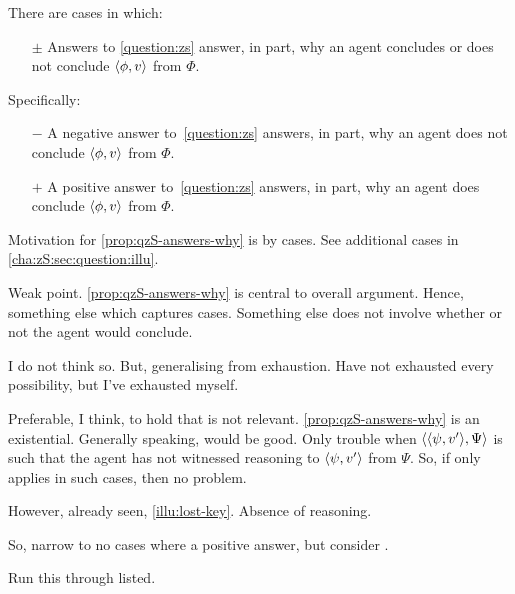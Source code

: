 \begin{note}
  \begin{idea}
    \label{prop:qzS-answers-why}
    There are cases in which:

    \begin{itemize}
    \item[\(\pm\)]
      Answers to \autoref{question:zs} answer, in part, why an agent concludes or does not conclude \(\langle \phi, v \rangle\) from \(\Phi\).
    \end{itemize}

    Specifically:
    \begin{itemize}
    \item[\(-\)]
      A negative answer to~\autoref{question:zs} answers, in part, why an agent does not conclude \(\langle \phi, v \rangle\) from \(\Phi\).
    \item[\(+\)]
      A positive answer to~\autoref{question:zs} answers, in part, why an agent does conclude \(\langle \phi, v \rangle\) from \(\Phi\).
    \end{itemize}
  \end{idea}

  Motivation for \autoref{prop:qzS-answers-why} is by cases.
  See additional cases in \autoref{cha:zS:sec:question:illu}.

  Weak point.
  \autoref{prop:qzS-answers-why} is central to overall argument.
  Hence, something else which captures cases.
  Something else does not involve whether or not the agent would conclude.

  I do not think so.
  But, generalising from exhaustion.
  Have not exhausted every possibility, but I've exhausted myself.

  Preferable, I think, to hold that \qzS{} is not relevant.
  \autoref{prop:qzS-answers-why} is an existential.
  Generally speaking, would be good.
  Only trouble when \(\langle \langle \psi, v' \rangle, \Psi \rangle\) is such that the agent has not witnessed reasoning to \(\langle \psi, v' \rangle\) from \(\Psi\).
  So, if \qzS{} only applies in such cases, then no problem.

  However, already seen, \autoref{illu:lost-key}.
  Absence of reasoning.

  So, narrow to no cases where a positive answer, but consider .
\end{note}

\begin{note}
  Run this through  listed.
\end{note}

